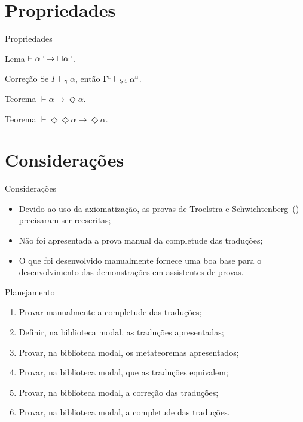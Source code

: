 \documentclass[table]{beamer}
\newcommand{\smallsquare}{{\scalebox{0.45}{$\square$}}}
\begin{document}
    \section[]{Propriedades}
    \begin{frame}{Propriedades}
        \justifying{}
        \begin{block}{Lema}
            $\vdash\alpha^\smallsquare\to\Box\alpha^\smallsquare$.
        \end{block}
        \begin{block}{Correção}
            Se $\Gamma\vdash_\mathfrak{I}\alpha$, então $\Gamma^\smallsquare\vdash_{S4}\alpha^\smallsquare$.
        \end{block}
        \begin{block}{Teorema}
            $\vdash\alpha\to\Diamond\alpha$.
        \end{block}
        \begin{block}{Teorema}
            $\vdash\Diamond\Diamond\alpha\to\Diamond\alpha$.
        \end{block}
    \end{frame}

    \section[]{Considerações}
    \begin{frame}{Considerações}
        \justifying{}
        \begin{itemize}
            \justifying{}
            \item Devido ao uso da axiomatização, as provas de Troelstra e Schwichtenberg~(\citeyear{Troelstra}) precisaram ser reescritas;
            \item Não foi apresentada a prova manual da completude das traduções;
            \item O que foi desenvolvido manualmente fornece uma boa base para o desenvolvimento das demonstrações em assistentes de provas.
        \end{itemize}
    \end{frame}

    \begin{frame}{Planejamento}
        \begin{enumerate}
            \item Provar manualmente a completude das traduções;
            \item Definir, na biblioteca modal, as traduções apresentadas;
            \item Provar, na biblioteca modal, os metateoremas apresentados;
            \item Provar, na biblioteca modal, que as traduções equivalem;
            \item Provar, na biblioteca modal, a correção das traduções;
            \item Provar, na biblioteca modal, a completude das traduções.
        \end{enumerate}
    \end{frame}
\end{document}

